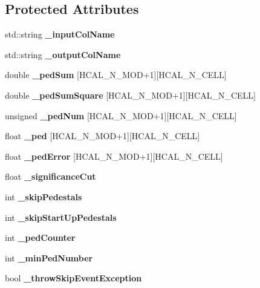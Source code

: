 \subsection*{Protected Attributes}
\begin{DoxyCompactItemize}
\item 
std::string {\bfseries \_\-inputColName}\label{classCALICE_1_1PedestalOnTheFlyProcessor_a715f7012132a51ed82c00b9e500980aa}

\item 
std::string {\bfseries \_\-outputColName}\label{classCALICE_1_1PedestalOnTheFlyProcessor_aa4bc9785a48b64ce13a93b087b74cd67}

\item 
double {\bfseries \_\-pedSum} [HCAL\_\-N\_\-MOD+1][HCAL\_\-N\_\-CELL]\label{classCALICE_1_1PedestalOnTheFlyProcessor_a82b074fc1d3fe2bdc109b85ea8ff703e}

\item 
double {\bfseries \_\-pedSumSquare} [HCAL\_\-N\_\-MOD+1][HCAL\_\-N\_\-CELL]\label{classCALICE_1_1PedestalOnTheFlyProcessor_abde1f46084ba80f3a20c28b41398cfc1}

\item 
unsigned {\bfseries \_\-pedNum} [HCAL\_\-N\_\-MOD+1][HCAL\_\-N\_\-CELL]\label{classCALICE_1_1PedestalOnTheFlyProcessor_a3e73753bc10884fa72f30cf89c4d98d1}

\item 
float {\bfseries \_\-ped} [HCAL\_\-N\_\-MOD+1][HCAL\_\-N\_\-CELL]\label{classCALICE_1_1PedestalOnTheFlyProcessor_a40378847dcd7aff4c79795eb3fceee41}

\item 
float {\bfseries \_\-pedError} [HCAL\_\-N\_\-MOD+1][HCAL\_\-N\_\-CELL]\label{classCALICE_1_1PedestalOnTheFlyProcessor_ad4a27e50c47ca620894a12248958ddb3}

\item 
float {\bfseries \_\-significanceCut}\label{classCALICE_1_1PedestalOnTheFlyProcessor_a5776cfb8ca374fbcee4f3ca87bcf9297}

\item 
int {\bfseries \_\-skipPedestals}\label{classCALICE_1_1PedestalOnTheFlyProcessor_a3528d68a6e0a2465c8550f8da410d44b}

\item 
int {\bfseries \_\-skipStartUpPedestals}\label{classCALICE_1_1PedestalOnTheFlyProcessor_abdf7d6fec744c128abcaeb987d0ccb50}

\item 
int {\bfseries \_\-pedCounter}\label{classCALICE_1_1PedestalOnTheFlyProcessor_a33772e03ef01ae351fac171af28920ee}

\item 
int {\bfseries \_\-minPedNumber}\label{classCALICE_1_1PedestalOnTheFlyProcessor_ab104343f3071e7b73d061149f3d09262}

\item 
bool {\bfseries \_\-throwSkipEventException}\label{classCALICE_1_1PedestalOnTheFlyProcessor_a3a75fe8a1e9a744048d0c5e4e5e59092}

\end{DoxyCompactItemize}


